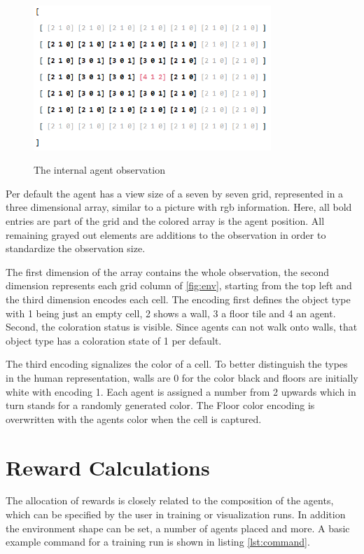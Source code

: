 \begin{figure}[hpbt]
    \centering
    \includegraphics[width=0.8\textwidth]{pictures/agent_observation}\\
    \caption[Agent Observation]{The internal agent observation}\label{fig:agent_obs}
\end{figure}

Per default the agent has a view size of a seven by seven grid, represented in a three dimensional array, similar to a picture with rgb information. Here, all bold entries are part of the grid and the colored array is the agent position. All remaining grayed out elements are additions to the observation in order to standardize the observation size.

The first dimension of the array contains the whole observation, the second dimension represents each grid column of \ref{fig:env}, starting from the top left and the third dimension encodes each cell. The encoding first defines the object type with 1 being just an empty cell, 2 shows a wall, 3 a floor tile and 4 an agent. Second, the coloration status is visible. Since agents can not walk onto walls, that object type has a coloration state of 1 per default.

The third encoding signalizes the color of a cell. To better distinguish the types in the human representation, walls are 0 for the color black and floors are initially white with encoding 1. Each agent is assigned a number from 2 upwards which in turn stands for a randomly generated color. The Floor color encoding is overwritten with the agents color when the cell is captured.

\section{Reward Calculations}
The allocation of rewards is closely related to the composition of the agents, which can be specified by the user in training or visualization runs. In addition the environment shape can be set, a number of agents placed and more. A basic example command for a training run is shown in listing \ref{lst:command}.

